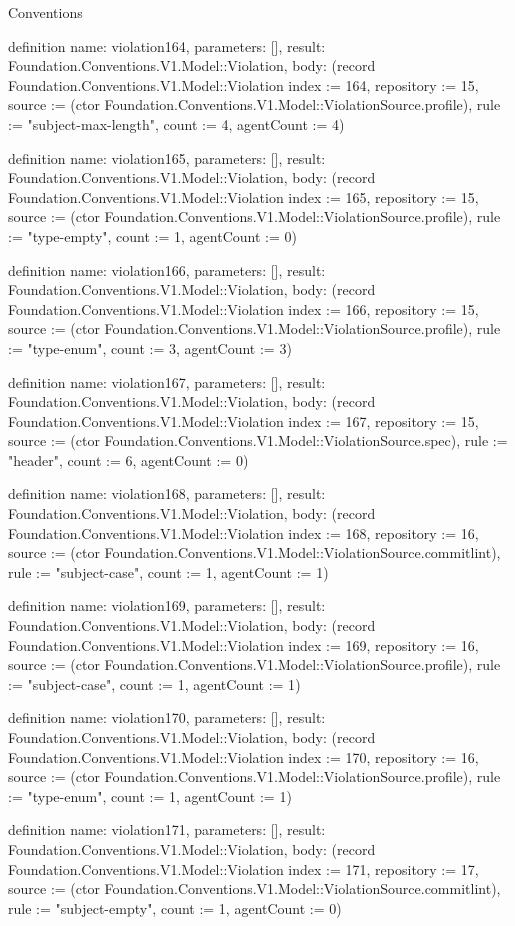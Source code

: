 \begin{lexlean}{Conventions}
\begin{semanticmodule}
definition{
  name: violation164,
  parameters: [],
  result: Foundation.Conventions.V1.Model::Violation,
  body: (record Foundation.Conventions.V1.Model::Violation {index := 164, repository := 15, source := (ctor Foundation.Conventions.V1.Model::ViolationSource.profile), rule := "subject-max-length", count := 4, agentCount := 4})
}

definition{
  name: violation165,
  parameters: [],
  result: Foundation.Conventions.V1.Model::Violation,
  body: (record Foundation.Conventions.V1.Model::Violation {index := 165, repository := 15, source := (ctor Foundation.Conventions.V1.Model::ViolationSource.profile), rule := "type-empty", count := 1, agentCount := 0})
}

definition{
  name: violation166,
  parameters: [],
  result: Foundation.Conventions.V1.Model::Violation,
  body: (record Foundation.Conventions.V1.Model::Violation {index := 166, repository := 15, source := (ctor Foundation.Conventions.V1.Model::ViolationSource.profile), rule := "type-enum", count := 3, agentCount := 3})
}

definition{
  name: violation167,
  parameters: [],
  result: Foundation.Conventions.V1.Model::Violation,
  body: (record Foundation.Conventions.V1.Model::Violation {index := 167, repository := 15, source := (ctor Foundation.Conventions.V1.Model::ViolationSource.spec), rule := "header", count := 6, agentCount := 0})
}

definition{
  name: violation168,
  parameters: [],
  result: Foundation.Conventions.V1.Model::Violation,
  body: (record Foundation.Conventions.V1.Model::Violation {index := 168, repository := 16, source := (ctor Foundation.Conventions.V1.Model::ViolationSource.commitlint), rule := "subject-case", count := 1, agentCount := 1})
}

definition{
  name: violation169,
  parameters: [],
  result: Foundation.Conventions.V1.Model::Violation,
  body: (record Foundation.Conventions.V1.Model::Violation {index := 169, repository := 16, source := (ctor Foundation.Conventions.V1.Model::ViolationSource.profile), rule := "subject-case", count := 1, agentCount := 1})
}

definition{
  name: violation170,
  parameters: [],
  result: Foundation.Conventions.V1.Model::Violation,
  body: (record Foundation.Conventions.V1.Model::Violation {index := 170, repository := 16, source := (ctor Foundation.Conventions.V1.Model::ViolationSource.profile), rule := "type-enum", count := 1, agentCount := 1})
}

definition{
  name: violation171,
  parameters: [],
  result: Foundation.Conventions.V1.Model::Violation,
  body: (record Foundation.Conventions.V1.Model::Violation {index := 171, repository := 17, source := (ctor Foundation.Conventions.V1.Model::ViolationSource.commitlint), rule := "subject-empty", count := 1, agentCount := 0})
}


\end{semanticmodule}
\end{lexlean}
